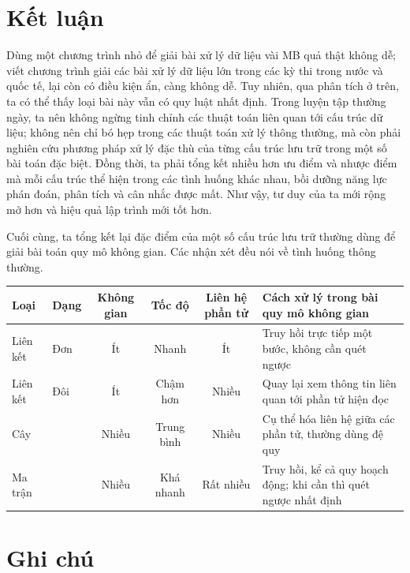 \documentclass[11pt]{article}
\begin{document}
\section{Kết luận}

Dùng một chương trình nhỏ để giải bài xử lý dữ liệu vài MB quả thật không dễ;
viết chương trình giải các bài xử lý dữ liệu lớn trong các kỳ thi trong nước
và quốc tế, lại còn có điều kiện ẩn, càng không dễ. Tuy nhiên, qua phân tích
ở trên, ta có thể thấy loại bài này vẫn có quy luật nhất định. Trong luyện
tập thường ngày, ta nên không ngừng tinh chỉnh các thuật toán liên quan tới
cấu trúc dữ liệu; không nên chỉ bó hẹp trong các thuật toán xử lý thông
thường, mà còn phải nghiên cứu phương pháp xử lý đặc thù của từng cấu trúc
lưu trữ trong một số bài toán đặc biệt. Đồng thời, ta phải tổng kết nhiều
hơn ưu điểm và nhược điểm mà mỗi cấu trúc thể hiện trong các tình huống khác
nhau, bồi dưỡng năng lực phán đoán, phân tích và cân nhắc được mất. Như vậy,
tư duy của ta mới rộng mở hơn và hiệu quả lập trình mới tốt hơn.

Cuối cùng, ta tổng kết lại đặc điểm của một số cấu trúc lưu trữ thường dùng
để giải bài toán quy mô không gian. Các nhận xét đều nói về tình huống thông
thường.

\begin{center}
\small
\begin{tabular}{@{}l l c c c p{5.3cm}@{}}
\hline
Loại & Dạng & Không gian & Tốc độ & Liên hệ phần tử &
Cách xử lý trong bài quy mô không gian\\
\hline
Liên kết & Đơn & Ít & Nhanh & Ít &
Truy hồi trực tiếp một bước, không cần quét ngược\\
Liên kết & Đôi & Ít & Chậm hơn & Nhiều &
Quay lại xem thông tin liên quan tới phần tử hiện đọc\\
Cây & & Nhiều & Trung bình & Nhiều &
Cụ thể hóa liên hệ giữa các phần tử, thường dùng đệ quy\\
Ma trận & & Nhiều & Khá nhanh & Rất nhiều &
Truy hồi, kể cả quy hoạch động; khi cần thì quét ngược nhất định\\
\hline
\end{tabular}
\end{center}

\appendix

\section{Ghi chú}
\end{document}
